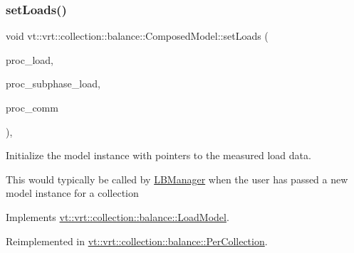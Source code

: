 \mbox{\label{classvt_1_1vrt_1_1collection_1_1balance_1_1_composed_model_af39d608580ad1512d11a45234c85e987}} 
\subsubsection{\texorpdfstring{set\+Loads()}{setLoads()}}
{\footnotesize\ttfamily void vt\+::vrt\+::collection\+::balance\+::\+Composed\+Model\+::set\+Loads (\begin{DoxyParamCaption}\item[{std\+::vector$<$ \hyperlink{namespacevt_1_1vrt_1_1collection_1_1balance_a45306ee4bf38fe3fb586d1ee2fa3d147}{Load\+Map\+Type} $>$ const $\ast$}]{proc\+\_\+load,  }\item[{std\+::vector$<$ \hyperlink{namespacevt_1_1vrt_1_1collection_1_1balance_a3d91523158c1025b7b665240072f3b7e}{Subphase\+Load\+Map\+Type} $>$ const $\ast$}]{proc\+\_\+subphase\+\_\+load,  }\item[{std\+::vector$<$ \hyperlink{namespacevt_1_1vrt_1_1collection_1_1balance_a10860c956804d644db54a16012352728}{Comm\+Map\+Type} $>$ const $\ast$}]{proc\+\_\+comm }\end{DoxyParamCaption})\hspace{0.3cm}{\ttfamily [override]}, {\ttfamily [virtual]}}



Initialize the model instance with pointers to the measured load data. 

This would typically be called by \hyperlink{structvt_1_1vrt_1_1collection_1_1balance_1_1_l_b_manager}{L\+B\+Manager} when the user has passed a new model instance for a collection 

Implements \hyperlink{classvt_1_1vrt_1_1collection_1_1balance_1_1_load_model_a5a567ca5a78f82e79d846c0b2ddbd07a}{vt\+::vrt\+::collection\+::balance\+::\+Load\+Model}.



Reimplemented in \hyperlink{structvt_1_1vrt_1_1collection_1_1balance_1_1_per_collection_a3bb3d9cfd738fa4db83399e28a2bd2f2}{vt\+::vrt\+::collection\+::balance\+::\+Per\+Collection}.

\mbox{\label{classvt_1_1vrt_1_1collection_1_1balance_1_1_composed_model_ad8108b4392d63b7f09e443920a64933a}} 
